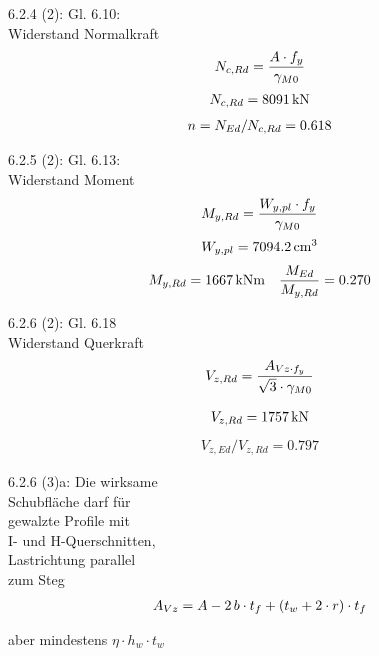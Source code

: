 \documentclass[graybox,envcountchap,sectrefs]{svmono}
\begin{document}
\pagestyle{empty}
6.2.4 (2): Gl. 6.10:\\
Widerstand Normalkraft\\
\begin{align}
N_{c,Rd} = \frac{A \cdot f_y }{\gamma_{M0}} \nonumber
\end{align}
\begin{align}
N_{c,Rd} = 8091\,\text{kN} \nonumber
\end{align}
\begin{align}
n = N_{Ed} / N_{c,Rd} = 0.618\nonumber
\end{align}

6.2.5 (2): Gl. 6.13: \\
Widerstand Moment\\
\begin{align}
M_{y,Rd} = \frac{W_{y,pl} \cdot f_y}{\gamma_{M0}}\nonumber
\end{align}
\begin{align}
W_{y,pl} = 7094.2\, \text{cm}^3\nonumber
\end{align}
\begin{align}
M_{y,Rd} = 1667\,\text{kNm}\quad \frac{M_{Ed}}{M_{y,Rd}} = 0.270\nonumber
\end{align}

6.2.6 (2): Gl. 6.18 \\
Widerstand Querkraft \\

\begin{align}
V_{z,Rd} = \frac{A_{Vz \cdot f_y}}{\sqrt{3} \cdot \gamma_{M0}} \nonumber
\end{align}

\begin{align}
V_{z,Rd} = 1757\,\text{kN} \nonumber
\end{align}
\begin{align}
V_{z,Ed}/V_{z,Rd} = 0.797
\end{align}

6.2.6 (3)a: Die wirksame\\ Schubfl\"{a}che darf f\"{u}r\\ gewalzte Profile mit\\ I- und H-Querschnitten, \\ Lastrichtung parallel\\
 zum Steg\\

 \begin{align}
 A_{Vz} = A - 2\,b \cdot t_f + (t_w + 2 \cdot r) \cdot t_f \nonumber
 \end{align}

 aber mindestens $\eta \cdot h_w \cdot t_w$\\
\end{document}

